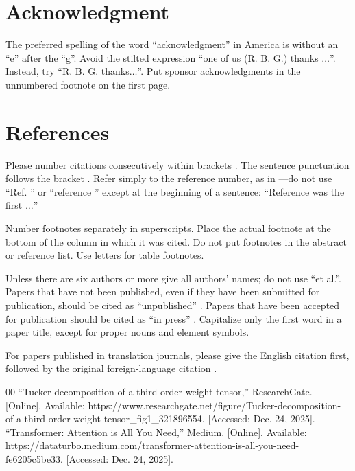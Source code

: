 \documentclass[conference]{IEEEtran}
\begin{document}


\section*{Acknowledgment}

The preferred spelling of the word ``acknowledgment'' in America is without 
an ``e'' after the ``g''. Avoid the stilted expression ``one of us (R. B. 
G.) thanks $\ldots$''. Instead, try ``R. B. G. thanks$\ldots$''. Put sponsor 
acknowledgments in the unnumbered footnote on the first page.

\section*{References}

Please number citations consecutively within brackets \cite{b1}. The 
sentence punctuation follows the bracket \cite{b2}. Refer simply to the reference 
number, as in \cite{b3}---do not use ``Ref. \cite{b3}'' or ``reference \cite{b3}'' except at 
the beginning of a sentence: ``Reference \cite{b3} was the first $\ldots$''

Number footnotes separately in superscripts. Place the actual footnote at 
the bottom of the column in which it was cited. Do not put footnotes in the 
abstract or reference list. Use letters for table footnotes.

Unless there are six authors or more give all authors' names; do not use 
``et al.''. Papers that have not been published, even if they have been 
submitted for publication, should be cited as ``unpublished'' \cite{b4}. Papers 
that have been accepted for publication should be cited as ``in press'' \cite{b5}. 
Capitalize only the first word in a paper title, except for proper nouns and 
element symbols.

For papers published in translation journals, please give the English 
citation first, followed by the original foreign-language citation \cite{b6}.

\begin{thebibliography}{00}
 ``Tucker decomposition of a third-order weight tensor,'' ResearchGate. [Online]. Available: https://www.researchgate.net/figure/Tucker-decomposition-of-a-third-order-weight-tensor\_fig1\_321896554. [Accessed: Dec. 24, 2025].
 ``Transformer: Attention is All You Need,'' Medium. [Online]. Available: https://dataturbo.medium.com/transformer-attention-is-all-you-need-fe6205c5be33. [Accessed: Dec. 24, 2025].
\end{thebibliography}
\end{document}
